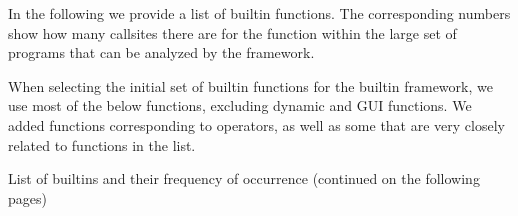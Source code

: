 In the following we provide a list of \matlab builtin functions.
The corresponding numbers show how many callsites there are for the function
within the large set of \matlab programs that can be analyzed by the \mcbench framework.

When selecting the initial set of builtin functions for the 
builtin framework, we use most of the below functions, excluding
dynamic and GUI functions. We added functions corresponding
to \matlab operators, as well as some  that are very
closely related to functions in the list.

\begin{table}
\caption[List of builtins and their frequency of occurrence]{List of builtins and their frequency of occurrence (continued on the following pages)}
\end{table}


